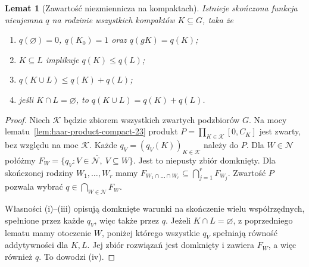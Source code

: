 \documentclass[11pt,a4paper,oneside]{book}
\numberwithin{equation}{chapter}
\theoremstyle{plain}
\newtheorem{lemat}[twierdzenie]{Lemat}
\theoremstyle{definition}
\theoremstyle{remark}
\begin{document}
\begin{lemat}[Zawartość niezmiennicza na kompaktach]
\label{lem:haar-content-23}
Istnieje skończona funkcja nieujemna $q$ na rodzinie
wszystkich kompaktów $K\subseteq G$, taka że
\begin{enumerate}[label=(\roman*)]
\item $q(\varnothing)=0$, $q(K_0)=1$ oraz $q(gK)=q(K)$;
\item $K\subseteq L$ implikuje $q(K)\le q(L)$;
\item $q(K\cup L)\le q(K)+q(L)$;
\item jeśli $K\cap L=\varnothing$, to
      $q(K\cup L)=q(K)+q(L)$.
\end{enumerate}
\end{lemat}
\begin{proof}
Niech $\mathcal K$ będzie zbiorem wszystkich zwartych
podzbiorów $G$. Na mocy
lematu~\ref{lem:haar-product-compact-23} produkt
$P=\prod_{K\in\mathcal K}[0,C_K]$ jest zwarty,
bez względu na moc $\mathcal K$.
Każde $q_V=(q_V(K))_{K\in\mathcal K}$ należy do $P$.
Dla $W\in\mathcal N$ połóżmy
$F_W=\overline{\{q_V:V\in\mathcal N,\ V\subseteq W\}}$.
Jest to niepusty zbiór domknięty. Dla skończonej
rodziny $W_1,\dots,W_r$ mamy
$F_{W_1\cap\dots\cap W_r}\subseteq\bigcap_{j=1}^rF_{W_j}$.
Zwartość $P$ pozwala wybrać
$q\in\bigcap_{W\in\mathcal N}F_W$.

Własności (i)--(iii) opisują domknięte warunki na
skończenie wielu współrzędnych, spełnione przez
każde $q_V$, więc także przez $q$.
Jeżeli $K\cap L=\varnothing$, z poprzedniego lematu
mamy otoczenie $W$, poniżej którego wszystkie $q_V$
spełniają równość addytywności dla $K,L$.
Jej zbiór rozwiązań jest domknięty i zawiera $F_W$,
a więc również $q$. To dowodzi (iv).
\end{proof}
\end{document}
